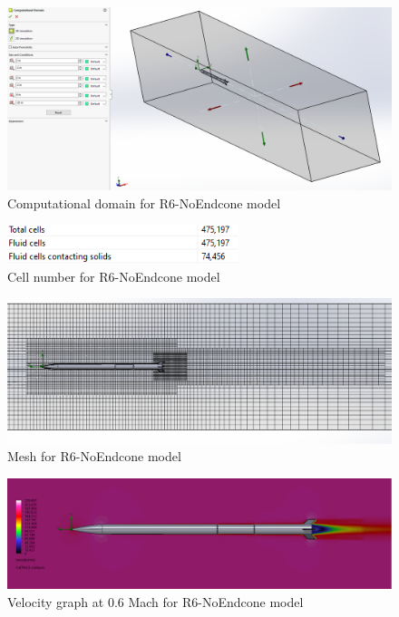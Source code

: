 \documentclass{article}
\begin{document}
\begin{figure}[H]
    \centering
    \includegraphics[width=\textwidth]{../data/R6-NoEndcone-Solid/domain.png}
    \caption{Computational domain for R6-NoEndcone model}
\end{figure}
\begin{figure}[H]
    \centering
    \includegraphics[width=0.6\textwidth]{../data/R6-NoEndcone-Solid/cells.png}
    \caption{Cell number for R6-NoEndcone model}
\end{figure}

\begin{figure}[H]
    \centering
    \includegraphics[width=\textwidth]{../data/R6-NoEndcone-Solid/mesh.png}
    \caption{Mesh for R6-NoEndcone model}
\end{figure}
\begin{figure}[H]
    \centering
    \includegraphics[width=\textwidth]{../data/R6-NoEndcone-Solid/speed.png}
    \caption{Velocity graph at 0.6 Mach for R6-NoEndcone    model}
\end{figure}
\end{document}
